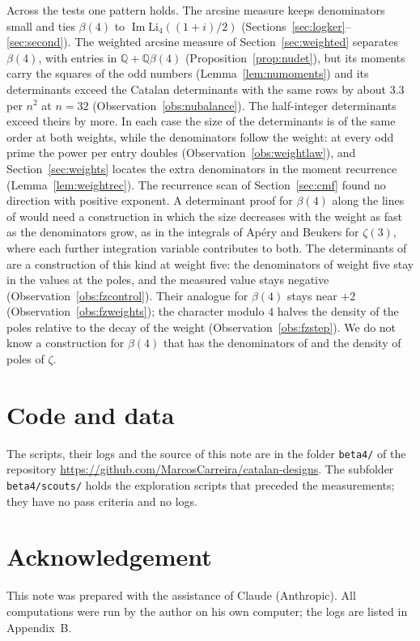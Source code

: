 \documentclass[11pt]{article}
\theoremstyle{definition}
\newcommand{\repo}{\url{https://github.com/MarcosCarreira/catalan-designs}}
\begin{document}
Across the tests one pattern holds. The arcsine measure keeps denominators small and ties $\beta(4)$ to $\operatorname{Im}\mathrm{Li}_4((1+i)/2)$ (Sections~\ref{sec:logker}--\ref{sec:second}). The weighted arcsine measure of Section~\ref{sec:weighted} separates $\beta(4)$, with entries in $\mathbb Q+\mathbb Q\beta(4)$ (Proposition~\ref{prop:nudet}), but its moments carry the squares of the odd numbers (Lemma~\ref{lem:numoments}) and its determinants exceed the Catalan determinants with the same rows by about $3.3$ per $n^2$ at $n=32$ (Observation~\ref{obs:nubalance}). The half-integer determinants exceed theirs by more. In each case the size of the determinants is of the same order at both weights, while the denominators follow the weight: at every odd prime the power per entry doubles (Observation~\ref{obs:weightlaw}), and Section~\ref{sec:weights} locates the extra denominators in the moment recurrence (Lemma~\ref{lem:weightrec}). The recurrence scan of Section~\ref{sec:cmf} found no direction with positive exponent. A determinant proof for $\beta(4)$ along the lines of \cite{OAI} would need a construction in which the size decreases with the weight as fast as the denominators grow, as in the integrals of Ap\'ery and Beukers for $\zeta(3)$, where each further integration variable contributes to both. The determinants of \cite{Fauzan} are a construction of this kind at weight five: the denominators of weight five stay in the values at the poles, and the measured value stays negative (Observation~\ref{obs:fzcontrol}). Their analogue for $\beta(4)$ stays near $+2$ (Observation~\ref{obs:fzweights}); the character modulo $4$ halves the density of the poles relative to the decay of the weight (Observation~\ref{obs:fzstep}). We do not know a construction for $\beta(4)$ that has the denominators of \cite{Fauzan} and the density of poles of $\zeta$.

\section*{Code and data}
The scripts, their logs and the source of this note are in the folder \texttt{beta4/} of the repository \repo. The subfolder \texttt{beta4/scouts/} holds the exploration scripts that preceded the measurements; they have no pass criteria and no logs.

\section*{Acknowledgement}
This note was prepared with the assistance of Claude (Anthropic). All computations were run by the author on his own computer; the logs are listed in Appendix~B.
\end{document}
